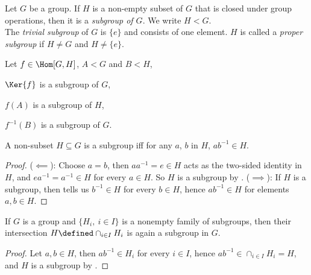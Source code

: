 \documentclass[../main-v2-manifolds.tex]{subfiles}
\begin{document}
\begin{definition}[Subgroup {$H< G$}]\label{hungerford-chp1:subgroup-definition}
    Let $G$ be a group. If $H$ is a non-empty subset of $G$ that is closed under group operations, then it is a \emph{subgroup of $G$}. We write $H<G$.\\

    The \emph{trivial subgroup} of $G$ is $\{e\}$ and consists of one element. $H$ is called a \emph{proper subgroup} if $H\neq G$ and $H\neq \{e\}$.
\end{definition}

\begin{wts}\label{hungerford-chp1:exercise9}
    Let $f\in\Hom[G,H]$, $A<G$ and $B<H$,
    \begin{enumroman}
        \item $\Ker{f}$ is a subgroup of $G$,
        \item $f(A)$ is a subgroup of $H$,
        \item $f^{-1}(B)$ is a subgroup of $G$.
    \end{enumroman}
\end{wts}


\begin{wts}\label{hungerford-chp1:theorem2.5}
    A non-subset $H\subseteq G$ is a subgroup iff for any $a$, $b$ in $H$, $ab^{-1}\in H$.
\end{wts}
\begin{proof}
    ($\impliedby$): Choose $a=b$, then $aa^{-1}=e\in H$ acts as the two-sided identity in $H$, and $ea^{-1}=a^{-1}\in H$ for every $a\in H$. So $H$ is a subgroup by . ($\implies$): If $H$ is a subgroup, then  tells us $b^{-1}\in H$ for every $b\in H$, hence $ab^{-1}\in H$ for elements $a,b\in H$.
\end{proof}
\begin{corollary}\label{hungerford-chp1:corollary2.6}
    If $G$ is a group and $\{H_i,\: i\in I\}$ is a nonempty family of subgroups, then their intersection $H\defined \cap_{i\in I}H_i$ is again a subgroup in $G$.
\end{corollary}
\begin{proof}
    Let $a,b\in H$, then $ab^{-1}\in H_i$ for every $i\in I$, hence $ab^{-1}\in \cap_{i\in I}H_i=H$, and $H$ is a subgroup by .
\end{proof}
\end{document}
